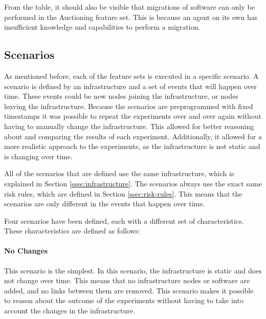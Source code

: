From the table, it should also be visible that migrations of software can only be performed in the Auctioning feature set. This is because an agent on its own has insufficient knowledge and capabilities to perform a migration.

\subsection{Scenarios}
As mentioned before, each of the feature sets is executed in a specific scenario. A scenario is defined by an infrastructure and a set of events that will happen over time. These events could be new nodes joining the infrastructure, or nodes leaving the infrastructure. Because the scenarios are preprogrammed with fixed timestamps it was possible to repeat the experiments over and over again without having to manually change the infrastructure. This allowed for better reasoning about and comparing the results of each experiment. Additionally, it allowed for a more realistic approach to the experiments, as the infrastructure is not static and is changing over time.

All of the scenarios that are defined use the same infrastructure, which is explained in Section \ref{ssec:infrastructure}. The scenarios always use the exact same risk rules, which are defined in Section \ref{ssec:risk-rules}. This means that the scenarios are only different in the events that happen over time.

Four scenarios have been defined, each with a different set of characteristics. These characteristics are defined as follows:


\paragraph*{No Changes}
This scenario is the simplest. In this scenario, the infrastructure is static and does not change over time. This means that no infrastructure nodes or software are added, and no links between them are removed. This scenario makes it possible to reason about the outcome of the experiments without having to take into account the changes in the infrastructure. 

